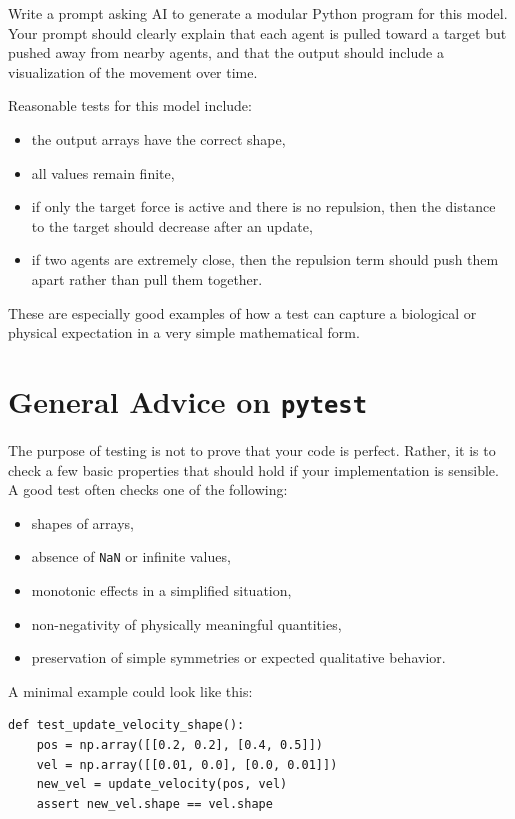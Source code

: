 \documentclass[paper=letter, fontsize=12pt]{article}
\numberwithin{equation}{section}
\begin{document}
\begin{aibox}
Write a prompt asking AI to generate a modular Python program for this model. Your prompt should clearly explain that each agent is pulled toward a target but pushed away from nearby agents, and that the output should include a visualization of the movement over time.
\end{aibox}

\begin{testbox}
Reasonable tests for this model include:
\begin{itemize}
\item the output arrays have the correct shape,
\item all values remain finite,
\item if only the target force is active and there is no repulsion, then the distance to the target should decrease after an update,
\item if two agents are extremely close, then the repulsion term should push them apart rather than pull them together.
\end{itemize}
These are especially good examples of how a test can capture a biological or physical expectation in a very simple mathematical form.
\end{testbox}

\section*{General Advice on \texttt{pytest}}

The purpose of testing is not to prove that your code is perfect. Rather, it is to check a few basic properties that should hold if your implementation is sensible. A good test often checks one of the following:
\begin{itemize}
\item shapes of arrays,
\item absence of \texttt{NaN} or infinite values,
\item monotonic effects in a simplified situation,
\item non-negativity of physically meaningful quantities,
\item preservation of simple symmetries or expected qualitative behavior.
\end{itemize}

A minimal example could look like this:

\begin{lstlisting}
def test_update_velocity_shape():
    pos = np.array([[0.2, 0.2], [0.4, 0.5]])
    vel = np.array([[0.01, 0.0], [0.0, 0.01]])
    new_vel = update_velocity(pos, vel)
    assert new_vel.shape == vel.shape
\end{lstlisting}
\end{document}
